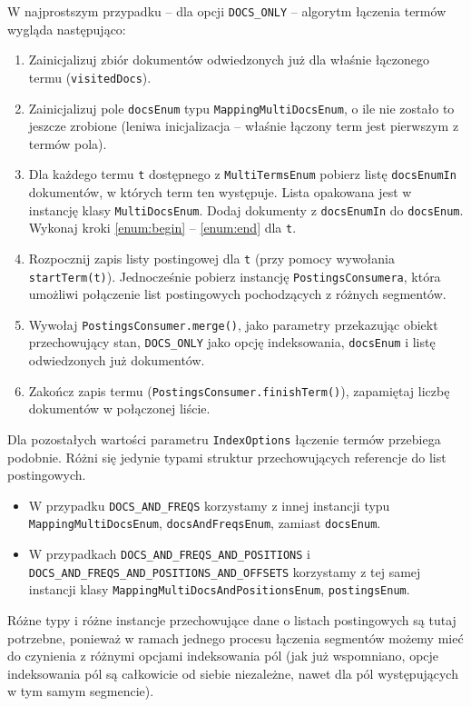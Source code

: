 W najprostszym przypadku -- dla opcji \texttt{DOCS\_ONLY} -- algorytm łączenia termów wygląda następująco:
\begin{enumerate}
 \item Zainicjalizuj zbiór dokumentów odwiedzonych już dla właśnie łączonego termu (\texttt{visitedDocs}).
 \item Zainicjalizuj pole \texttt{docsEnum} typu \texttt{MappingMultiDocsEnum}, o ile nie zostało to jeszcze zrobione (leniwa inicjalizacja -- właśnie łączony term jest pierwszym z termów pola).
 \item Dla każdego termu \texttt{t} dostępnego z \texttt{MultiTermsEnum} pobierz listę \texttt{docsEnumIn} dokumentów, w których term ten występuje. Lista opakowana jest w instancję klasy \texttt{MultiDocsEnum}. Dodaj dokumenty z \texttt{docsEnumIn} do \texttt{docsEnum}. Wykonaj kroki \ref{enum:begin} -- \ref{enum:end} dla \texttt{t}.
 \item \label{enum:begin} Rozpocznij zapis listy postingowej dla \texttt{t} (przy pomocy wywołania \texttt{startTerm(t)}). Jednocześnie pobierz instancję \texttt{PostingsConsumera}, która umożliwi połączenie list postingowych pochodzących z różnych segmentów.
 \item Wywołaj \texttt{PostingsConsumer.merge()}, jako parametry przekazując obiekt przechowujący stan, \texttt{DOCS\_ONLY} jako opcję indeksowania, \texttt{docsEnum} i listę odwiedzonych już dokumentów.
 \item \label{enum:end} Zakończ zapis termu (\texttt{PostingsConsumer.finishTerm()}), zapamiętaj liczbę dokumentów w połączonej liście.
\end{enumerate}

Dla pozostałych wartości parametru \texttt{IndexOptions} łączenie termów przebiega podobnie. Różni się jedynie typami struktur przechowujących referencje do list postingowych.
\begin{itemize}
 \item W przypadku \texttt{DOCS\_AND\_FREQS} korzystamy z innej instancji typu \texttt{MappingMultiDocsEnum}, \texttt{docsAndFreqsEnum}, zamiast \texttt{docsEnum}.
 \item W przypadkach \texttt{DOCS\_AND\_FREQS\_AND\_POSITIONS} i \texttt{DOCS\_AND\_FREQS\_AND\_POSITIONS\_AND\_OFFSETS} korzystamy z tej samej instancji klasy \texttt{MappingMultiDocsAndPositionsEnum}, \texttt{postingsEnum}.
\end{itemize}
Różne typy i różne instancje przechowujące dane o listach postingowych są tutaj potrzebne, ponieważ w ramach jednego procesu łączenia segmentów możemy mieć do czynienia z różnymi opcjami indeksowania pól (jak już wspomniano, opcje indeksowania pól są całkowicie od siebie niezależne, nawet dla pól występujących w tym samym segmencie).

